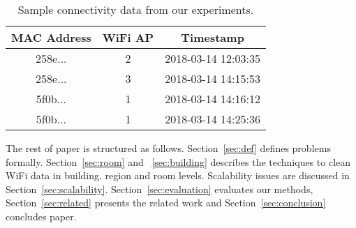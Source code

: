 \begin{table}[!htb]
	\centering
	\caption{Sample connectivity data from our experiments.}
	\label{tab:connectivity}
	\label{tab:wifi}
	\begin{tabular}{|c|c|c|}
		\hline
		MAC Address & WiFi AP & Timestamp \\ \hline
		258e... & 2 & 2018-03-14 12:03:35  \\ \hline
		258e... & 3 & 2018-03-14 14:15:53 \\ \hline
		5f0b... & 1 & 2018-03-14 14:16:12 \\ \hline
		5f0b... & 1 & 2018-03-14 14:25:36 \\ \hline
	\end{tabular}
	\vspace{-0.5em}
\end{table} 

The rest of paper is structured as follows. Section~\ref{sec:def} defines problems formally. Section~\ref{sec:room} and ~\ref{sec:building} describes the techniques to clean WiFi data in building, region and room levels. Scalability issues are discussed in Section~\ref{sec:scalability}. Section~\ref{sec:evaluation} evaluates our methods, Section~\ref{sec:related} presents the related work and Section~\ref{sec:conclusion} concludes paper. 
